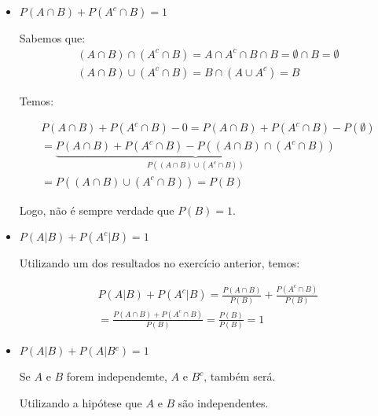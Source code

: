\begin{itemize}
  \item $P\left( {A \cap B} \right) + P\left( {{A^c} \cap B} \right) = 1$

  Sabemos que:
  \[\begin{array}{l}
  \displaystyle
  \left( {A \cap B} \right) \cap \left( {{A^c} \cap B} \right) = A \cap {A^c} \cap B \cap B = \emptyset  \cap B = \emptyset \\
  \left( {A \cap B} \right) \cup \left( {{A^c} \cap B} \right) = B \cap \left( {A \cup {A^c}} \right) = B
  \end{array}\]

  Temos:

  \[\begin{array}{l}
  \displaystyle
  P\left( {A \cap B} \right) + P\left( {{A^c} \cap B} \right) - 0 = P\left( {A \cap B} \right) + P\left( {{A^c} \cap B} \right) - P\left( \emptyset  \right)\\
   = \underbrace {P\left( {A \cap B} \right) + P\left( {{A^c} \cap B} \right) - P\left( {\left( {A \cap B} \right) \cap \left( {{A^c} \cap B} \right)} \right)}_{P\left( {\left( {A \cap B} \right) \cup \left( {{A^c} \cap B} \right)} \right)} \\
   = P\left( {\left( {A \cap B} \right) \cup \left( {{A^c} \cap B} \right)} \right) = P\left( B \right)
  \end{array}\]

  Logo, não é sempre verdade que $P(B) = 1$.

  \item $P\left( {A|B} \right) + P\left( {{A^c}|B} \right) = 1$

  Utilizando um dos resultados no exercício anterior, temos:

  \[\begin{array}{l}
  \displaystyle
  P\left( {A|B} \right) + P\left( {{A^c}|B} \right) = \frac{{P\left( {A \cap B} \right)}}{{P\left( B \right)}} + \frac{{P\left( {{A^c} \cap B} \right)}}{{P\left( B \right)}}\\
   = \frac{{P\left( {A \cap B} \right) + P\left( {{A^c} \cap B} \right)}}{{P\left( B \right)}} = \frac{{P\left( B \right)}}{{P\left( B \right)}} = 1
  \end{array}\]

  \item $P\left( {A|B} \right) + P\left( {A|B{^c}} \right) = 1$

  Se $A$ e $B$ forem independemte, $A$ e $B^c$, também será.

  Utilizando a hipótese que $A$ e $B$ são independentes.


\end{itemize}
